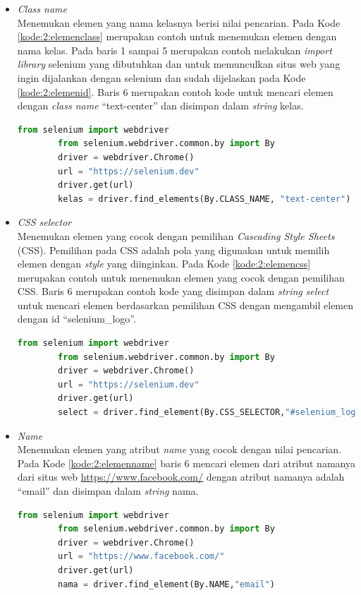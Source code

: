 \begin{itemize}
	\item \textit{Class name}\\
	Menemukan elemen yang nama kelasnya berisi nilai pencarian. Pada Kode \ref{kode:2:elemenclass} merupakan contoh untuk menemukan elemen dengan nama kelas. Pada baris 1 sampai 5 merupakan contoh melakukan \textit{import library} selenium yang dibutuhkan dan untuk memunculkan situs web yang ingin dijalankan dengan selenium dan sudah dijelaskan pada Kode \ref{kode:2:elemenid}. Baris 6 merupakan contoh kode untuk mencari elemen dengan \textit{class name} ``text-center'' dan disimpan dalam \textit{string} kelas.
	\begin{lstlisting}[language=python, caption=Contoh kode untuk menemukan elemen dengan \textit{class name}, label=kode:2:elemenclass]
		from selenium import webdriver
		from selenium.webdriver.common.by import By
		driver = webdriver.Chrome()
		url = "https://selenium.dev"
		driver.get(url)
		kelas = driver.find_elements(By.CLASS_NAME, "text-center")
	\end{lstlisting}
	\item \textit{CSS selector}\\
	Menemukan elemen yang cocok dengan pemilihan \textit{Cascading Style Sheets} (CSS). Pemilihan pada CSS adalah pola yang digunakan untuk memilih elemen dengan \textit{style} yang diinginkan. Pada Kode \ref{kode:2:elemencss} merupakan contoh untuk menemukan elemen yang cocok dengan pemilihan CSS. Baris 6 merupakan contoh kode yang disimpan dalam \textit{string} \textit{select} untuk mencari elemen berdasarkan pemilihan CSS dengan mengambil elemen dengan id ``selenium\_logo''.
	\begin{lstlisting}[language=python, caption=Contoh kode untuk menemukan elemen dengan \textit{CSS selector}, label=kode:2:elemencss]
		from selenium import webdriver
		from selenium.webdriver.common.by import By
		driver = webdriver.Chrome()
		url = "https://selenium.dev"
		driver.get(url)
		select = driver.find_element(By.CSS_SELECTOR,"#selenium_logo")
	\end{lstlisting}
	
	\item \textit{Name}\\
	Menemukan elemen yang atribut \textit{name} yang cocok dengan nilai pencarian. Pada Kode \ref{kode:2:elemenname} baris 6 mencari elemen dari atribut namanya dari situs web \url{https://www.facebook.com/} dengan atribut namanya adalah ``email'' dan disimpan dalam \textit{string} nama.
	\begin{lstlisting}[language=python, caption=Contoh kode untuk menemukan elemen dengan atribut nama, label=kode:2:elemenname]
		from selenium import webdriver
		from selenium.webdriver.common.by import By
		driver = webdriver.Chrome()
		url = "https://www.facebook.com/"
		driver.get(url)
		nama = driver.find_element(By.NAME,"email")
	\end{lstlisting}
	

\end{itemize}
